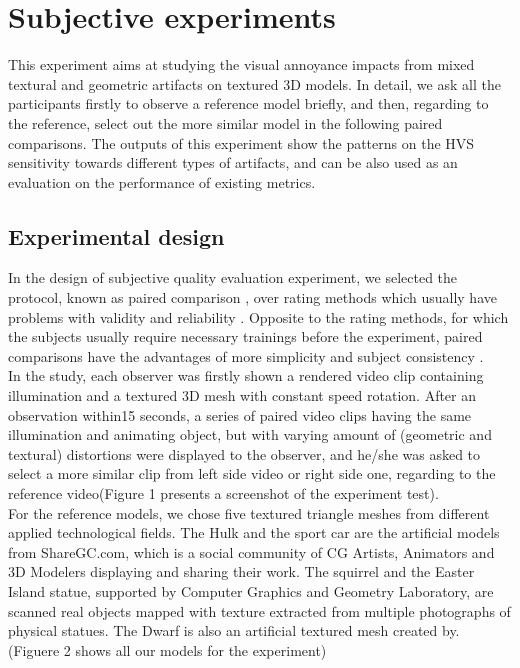 \section{Subjective experiments}
This experiment aims at studying the visual annoyance impacts from mixed textural and geometric artifacts on textured 3D models. In detail, we ask all the participants firstly to observe a reference model briefly, and then, regarding to the reference, select out the more similar model in the following paired comparisons. The outputs of this experiment show the patterns on the HVS sensitivity towards different types of artifacts, and can be also used as an evaluation on the performance of existing metrics.
\subsection{Experimental design}
In the design of subjective quality evaluation experiment, we selected the protocol, known as paired comparison \cite{Lee_2011}, over rating methods which usually have problems with validity and reliability \cite{Govindarajulu_1992}. Opposite to the rating methods, for which the subjects usually require necessary trainings before the experiment, paired comparisons have the advantages of more simplicity and subject consistency \cite{Wills_2009}. \\
In the study, each observer was firstly shown a rendered video clip containing illumination and a textured 3D mesh with constant speed rotation. After an observation within15 seconds, a series of paired video clips having the same illumination and animating object, but with varying amount of (geometric and textural) distortions were displayed to the observer, and he/she was asked to select a more similar clip from left side video or right side one, regarding to the reference video(Figure 1 presents a screenshot of the experiment test). \\
For the reference models, we chose five textured triangle meshes from different applied technological fields. The Hulk and the sport car are the artificial models from ShareGC.com, which is a social community of CG Artists, Animators and 3D Modelers displaying and sharing their work. The squirrel and the Easter Island statue, supported by Computer Graphics and Geometry Laboratory, are scanned real objects mapped with texture extracted from multiple photographs of physical statues. The Dwarf is also an artificial textured mesh created by. (Figuere 2 shows all our models for the experiment)\\
